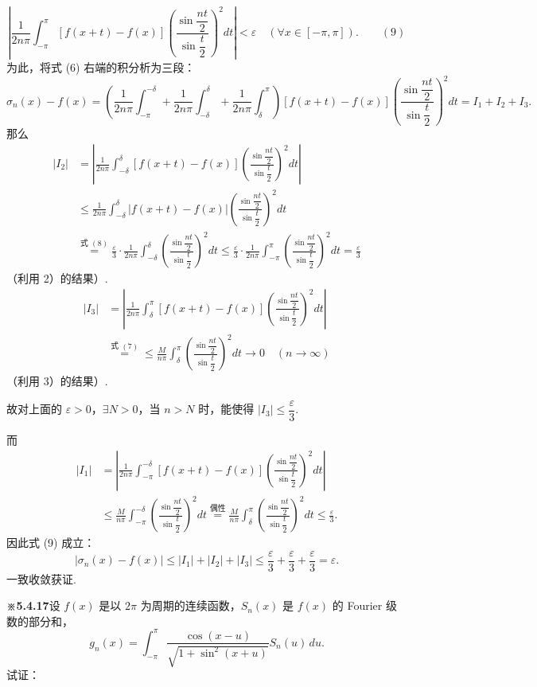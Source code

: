\documentclass[UTF8,12pt,a4paper,fontset=fandol]{ctexart}
\providecommand{\xlongequal}[1]{\stackrel{#1}{=}}
\begin{document}
\[
  \left|\frac1{2n\pi}\int_{-\pi}^{\pi}[f(x+t)-f(x)]
  \left(\frac{\sin\dfrac{nt}{2}}{\sin\dfrac t2}\right)^2dt\right|
  <\varepsilon\quad(\forall x\in[-\pi,\pi]). \qquad(9)
\]
为此，将式 (6) 右端的积分析为三段：
\[
  \sigma_n(x)-f(x)=
  \left(\frac1{2n\pi}\int_{-\pi}^{-\delta}
  +\frac1{2n\pi}\int_{-\delta}^{\delta}
  +\frac1{2n\pi}\int_{\delta}^{\pi}\right)
  [f(x+t)-f(x)]
  \left(\frac{\sin\dfrac{nt}{2}}{\sin\dfrac t2}\right)^2dt
  =I_1+I_2+I_3.
\]
那么
\[
\begin{aligned}
|I_2|
&=\left|\frac1{2n\pi}\int_{-\delta}^{\delta}[f(x+t)-f(x)]
\left(\frac{\sin\dfrac{nt}{2}}{\sin\dfrac t2}\right)^2dt\right|\\
&\le\frac1{2n\pi}\int_{-\delta}^{\delta}|f(x+t)-f(x)|
\left(\frac{\sin\dfrac{nt}{2}}{\sin\dfrac t2}\right)^2dt\\
&\xlongequal{\text{式 }(8)}
\frac{\varepsilon}{3}\cdot\frac1{2n\pi}\int_{-\delta}^{\delta}
\left(\frac{\sin\dfrac{nt}{2}}{\sin\dfrac t2}\right)^2dt
\le\frac{\varepsilon}{3}\cdot\frac1{2n\pi}\int_{-\pi}^{\pi}
\left(\frac{\sin\dfrac{nt}{2}}{\sin\dfrac t2}\right)^2dt
=\frac{\varepsilon}{3}
\end{aligned}
\]
（利用 2）的结果）.
\[
\begin{aligned}
|I_3|
&=\left|\frac1{2n\pi}\int_{\delta}^{\pi}[f(x+t)-f(x)]
\left(\frac{\sin\dfrac{nt}{2}}{\sin\dfrac t2}\right)^2dt\right|\\
&\xlongequal{\text{式 }(7)}
\le\frac{M}{n\pi}\int_{\delta}^{\pi}
\left(\frac{\sin\dfrac{nt}{2}}{\sin\dfrac t2}\right)^2dt\to0\quad(n\to\infty)
\end{aligned}
\]
（利用 3）的结果）.

故对上面的 $\varepsilon>0$，$\exists N>0$，当 $n>N$ 时，能使得
$|I_3|\le\dfrac{\varepsilon}{3}$.

而
\[
\begin{aligned}
|I_1|
&=\left|\frac1{2n\pi}\int_{-\pi}^{-\delta}[f(x+t)-f(x)]
\left(\frac{\sin\dfrac{nt}{2}}{\sin\dfrac t2}\right)^2dt\right|\\
&\le\frac{M}{n\pi}\int_{-\pi}^{-\delta}
\left(\frac{\sin\dfrac{nt}{2}}{\sin\dfrac t2}\right)^2dt
\xlongequal{\text{偶性}}
\frac{M}{n\pi}\int_{\delta}^{\pi}
\left(\frac{\sin\dfrac{nt}{2}}{\sin\dfrac t2}\right)^2dt
\le\frac{\varepsilon}{3}.
\end{aligned}
\]
因此式 (9) 成立：
\[
  |\sigma_n(x)-f(x)|\le |I_1|+|I_2|+|I_3|
  \le\frac{\varepsilon}{3}+\frac{\varepsilon}{3}+\frac{\varepsilon}{3}=\varepsilon.
\]
一致收敛获证.

\noindent\textbf{※5.4.17}\quad 设 $f(x)$ 是以 $2\pi$ 为周期的连续函数，$S_n(x)$ 是 $f(x)$ 的 Fourier 级数的部分和，
\[
  g_n(x)=\int_{-\pi}^{\pi}
  \frac{\cos(x-u)}{\sqrt{1+\sin^2(x+u)}}S_n(u)\,du.
\]
试证：
\end{document}
